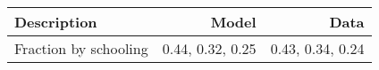 \begin{tabular}{lrr}
\hline
Description & Model  & Data  \\
\hline
Fraction by schooling & 0.44, 0.32, 0.25  & 0.43, 0.34, 0.24  \\
\hline
\end{tabular}%
